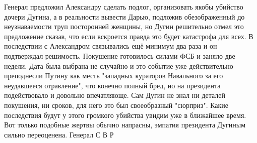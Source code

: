 Генерал предложил Александру сделать подлог, организовать якобы убийство дочери Дугина, а в реальности вывести Дарью, подложив обезображенный до неузнаваемости труп посторонней женщины, но Дугин решительно отмел это предложение сказав, что если вскроется правда это будет катастрофа для всех. В последствии с Александром связывались ещё минимум два раза и он подтверждал решимость. Покушение готовилось силами ФСБ и заняло две недели. Дата была выбрана не случайно и это событие уже действительно преподнесли Путину как месть "западных кураторов Навального за его неудавшееся отравление", что конечно полный бред, но на президента подействовало и довольно впечатляюще. Сам Дугин не знал ни деталей покушения, ни сроков, для него это был своеобразный "сюрприз". Какие последствия будут у этого громкого убийства увидим уже в ближайшее время. Вот только подобные жертвы обычно напрасны, эмпатия президента Дугиным сильно переоценена. Генерал С В Р



